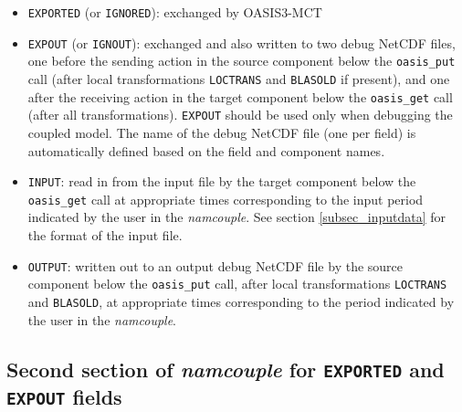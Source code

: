 \begin{itemize}
\item {\tt EXPORTED} (or {\tt IGNORED}): exchanged  by OASIS3-MCT
\item {\tt EXPOUT} (or {\tt IGNOUT}): exchanged and also written to two
  debug NetCDF files, one before the sending action in the source
  component below the {\tt oasis\_put} call (after local transformations
  {\tt LOCTRANS} and {\tt BLASOLD} if present), and one after the
  receiving action in the target component below the {\tt oasis\_get} call
  (after all transformations). {\tt EXPOUT} should be used only when
  debugging the coupled model. The name of the debug NetCDF file
  (one per field) is automatically defined based on the field and
  component names.
\item {\tt INPUT}: read in from the input file by the target component
  below the {\tt oasis\_get} call at
  appropriate times corresponding to the input period indicated by the
  user in the {\it namcouple}. See section \ref{subsec_inputdata} for
  the format of the input file.
\item {\tt OUTPUT}: written out to an output debug NetCDF file by the
  source component below the {\tt oasis\_put} call, after local
  transformations {\tt LOCTRANS} and {\tt BLASOLD}, at appropriate
  times corresponding to the period indicated by the user in
  the {\it namcouple}.

\end{itemize}

\subsection{Second section of {\it namcouple} for {\tt EXPORTED} and
  {\tt EXPOUT} fields}
\label{subsubsec_secondEXPORTED}


